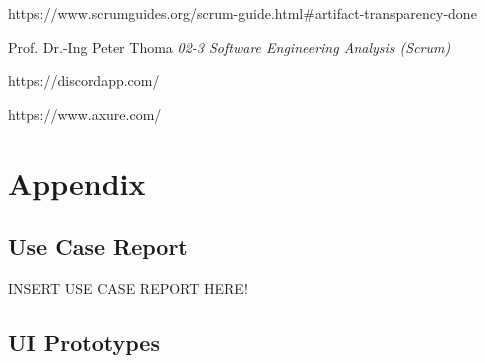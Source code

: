 \documentclass[a4paper, 12pt]{article}
\begin{document}
\newpage    
\begin{thebibliography}{}
https://www.scrumguides.org/scrum-guide.html\#artifact-transparency-done 

 Prof. Dr.-Ing Peter Thoma \emph{02-3 Software Engineering Analysis (Scrum)}
 
 https://discordapp.com/
 
 https://www.axure.com/

\end{thebibliography}


\newpage

\section{Appendix}

\subsection{Use Case Report}
INSERT USE CASE REPORT HERE!

\subsection{UI Prototypes}
\end{document}
